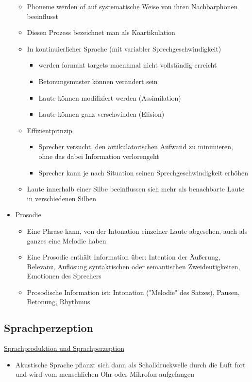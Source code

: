 \documentclass[a4paper,10pt,oneside]{article}
\begin{document}
\begin{itemize}
			\begin{itemize}
				\item Phoneme werden of auf systematische Weise von ihren Nachbarphonen beeinflusst
				\item Diesen Prozess bezeichnet man als Koartikulation
				\item In kontinuierlicher Sprache (mit variabler Sprechgeschwindigkeit)
					\begin{itemize}
						\item werden formant targets macnhmal nicht vollständig erreicht
						\item Betonungsmuster können verändert sein
						\item Laute können modifiziert werden (Assimilation)
						\item Laute können ganz verschwinden (Elision)
					\end{itemize}
				\item Effizientprinzip
					\begin{itemize}
						\item Sprecher versucht, den artikulatorischen Aufwand zu minimieren, ohne das dabei Information verlorengeht 
						\item Sprecher kann je nach Situation seinen Sprechgeschwindigkeit erhöhen 
					\end{itemize}
				\item Laute innerhalb einer Silbe beeinflussen sich mehr als benachbarte Laute in verschiedenen Silben
			\end{itemize}
		\item Prosodie 
			\begin{itemize}
				\item Eine Phrase kann, von der Intonation einzelner Laute abgesehen, auch als ganzes eine Melodie haben
				\item Eine Prosodie enthält Information über: Intention der Äußerung, Relevanz, Auflösung syntaktischen oder semantischen Zweideutigkeiten, Emotionen des Sprechers
				\item Prosodische Information ist: Intonation ("Melodie" des Satzes), Pausen, Betonung, Rhythmus
			\end{itemize}
	\end{itemize}

\subsection{Sprachperzeption}
\underline{Sprachproduktion und Sprachperzeption} \\
	\begin{itemize}
		\item Akustische Sprache pflanzt sich dann als Schalldruckwelle durch die Luft fort und wird vom menschlichen Ohr oder Mikrofon aufgefangen
	\end{itemize}
	
\end{document}
